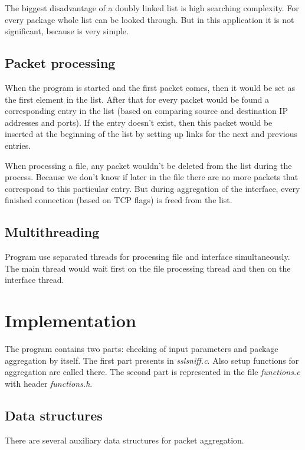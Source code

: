 \documentclass[12pt,a4paper]{article}
\begin{document}
    The biggest disadvantage of a doubly linked list is high searching complexity.
    For every package whole list can be looked through. But in this application 
    it is not significant, because is very simple. 

    \subsection{Packet processing}

    When the program is started and the first packet comes, then it would be set 
    as the first element in the list. After that for every packet would be found 
    a corresponding entry in the list (based on comparing source and destination 
    IP addresses and ports). If the entry doesn't exist, then this packet would 
    be inserted at the beginning of the list by setting up links for the next 
    and previous entries.
    
    When processing a file, any packet wouldn't be deleted from the list during 
    the process. Because we don't know if later in the file there are no more 
    packets that correspond to this particular entry. But during aggregation 
    of the interface, every finished connection (based on TCP flags) is freed 
    from the list.


    \subsection{Multithreading}
    Program use separated threads for processing file and interface simultaneously. 
    The main thread would wait first on the file processing thread and then on 
    the interface thread.

    
    \section{Implementation}
    The program contains two parts: checking of input parameters and package 
    aggregation by itself. The first part presents in \textit{sslsniff.c}. Also 
    setup functions for aggregation are called there. The second part is represented 
    in the file \textit{functions.c} with header \textit{functions.h}. 

    \subsection{Data structures}
    There are several auxiliary data structures for packet aggregation. 
\end{document}
